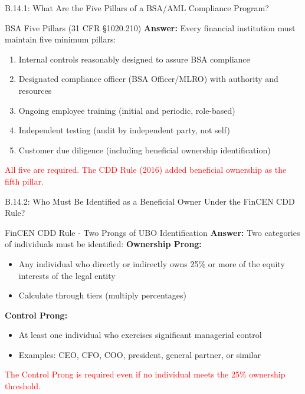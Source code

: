 \documentclass{beamer}
\begin{document}
	
	\begin{frame}{B.14.1: What Are the Five Pillars of a BSA/AML Compliance Program?}
		\begin{block}{BSA Five Pillars (31 CFR \S1020.210)}
			\textbf{Answer:} Every financial institution must maintain five minimum pillars:
			\vspace{0.2cm}
			\begin{enumerate}
				\item Internal controls reasonably designed to assure BSA compliance
				\item Designated compliance officer (BSA Officer/MLRO) with authority and resources
				\item Ongoing employee training (initial and periodic, role-based)
				\item Independent testing (audit by independent party, not self)
				\item Customer due diligence (including beneficial ownership identification)
			\end{enumerate}
			\textcolor{red}{All five are required. The CDD Rule (2016) added beneficial ownership as the fifth pillar.}
		\end{block}
	\end{frame}
	
	\begin{frame}{B.14.2: Who Must Be Identified as a Beneficial Owner Under the FinCEN CDD Rule?}
		\begin{block}{FinCEN CDD Rule - Two Prongs of UBO Identification}
			\textbf{Answer:} Two categories of individuals must be identified:
			\vspace{0.2cm}
			\textbf{Ownership Prong:}
			\begin{itemize}
				\item Any individual who directly or indirectly owns 25\% or more of the equity interests of the legal entity
				\item Calculate through tiers (multiply percentages)
			\end{itemize}
			\textbf{Control Prong:}
			\begin{itemize}
				\item At least one individual who exercises significant managerial control
				\item Examples: CEO, CFO, COO, president, general partner, or similar
			\end{itemize}
			\textcolor{red}{The Control Prong is required even if no individual meets the 25\% ownership threshold.}
		\end{block}
	\end{frame}
	
\end{document}
